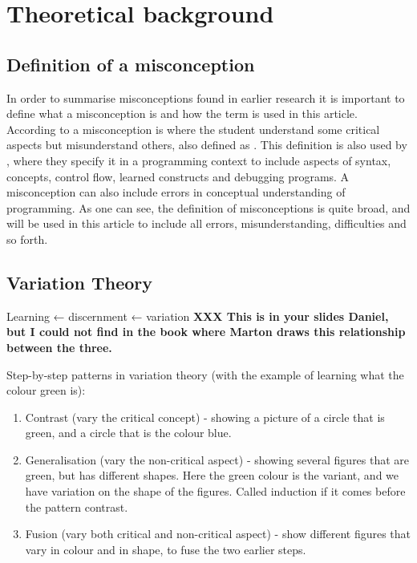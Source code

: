 \section{Theoretical background}

\subsection{Definition of a misconception}

In order to summarise misconceptions found in earlier research it is 
important to define what a misconception is and how the term is used in this 
article. According to \textcite{NCOL} a misconception is where the student 
understand some critical aspects but misunderstand others, also defined as 
. This definition is also used by 
\textcite{MisconceptionsSurvey2017}, where they specify it in a programming 
context to include aspects of syntax, concepts, control flow, learned 
constructs and debugging programs. A misconception can also include errors 
in 
conceptual understanding of programming. As one can see, the definition of 
misconceptions is quite broad, and will be used in this article to include 
all 
errors, misunderstanding, difficulties and so forth. 

\subsection{Variation Theory}

Learning ← discernment ← variation \textbf{XXX This is in your slides 
Daniel, but I could not find in the book where Marton draws this 
relationship between the three.}

Step-by-step patterns in variation theory (with the example of learning 
what the colour green is):

\begin{enumerate}
    \item Contrast (vary the critical concept) - showing a picture of a 
circle that is green, and a circle that is the colour blue.
    \item Generalisation (vary the non-critical aspect) - showing several 
figures that are green, but has different shapes. Here the green colour 
is the variant, and we have variation on the shape of the figures. 
Called induction if it comes before the pattern contrast.
    \item Fusion (vary both critical and non-critical aspect) - show 
different figures that vary in colour and in shape, to fuse the two 
earlier steps.
\end{enumerate}

